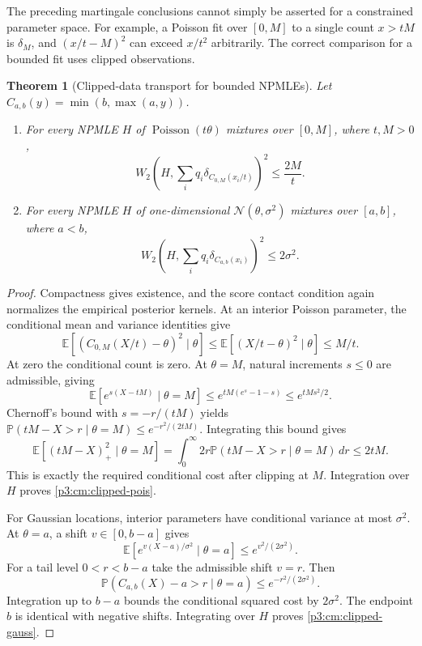 \documentclass[11pt,a4paper]{article}
\newtheorem{theorem}{Theorem}[section]
\theoremstyle{definition}
\theoremstyle{remark}
\numberwithin{equation}{section}
\begin{document}
The preceding martingale conclusions cannot simply be asserted for a
constrained parameter space.  For example, a Poisson fit over $[0,M]$
to a single count $x>tM$ is $\delta_M$, and
$(x/t-M)^2$ can exceed $x/t^2$ arbitrarily.  The correct comparison for
a bounded fit uses clipped observations.

\begin{theorem}[Clipped-data transport for bounded NPMLEs]
\label{p3:cm:clipped}
Let $C_{a,b}(y)=\min(b,\max(a,y))$.
\begin{enumerate}[label=(\roman*),leftmargin=*]
\item For every NPMLE $H$ of $\operatorname{Poisson}(t\theta)$ mixtures
over $[0,M]$, where $t,M>0$,
\begin{equation}\label{p3:cm:clipped-pois}
 W_2\left(H,\sum_iq_i\delta_{C_{0,M}(x_i/t)}\right)^2
 \le\frac{2M}{t}.
\end{equation}
\item For every NPMLE $H$ of one-dimensional
$\mathcal N(\theta,\sigma^2)$ mixtures over $[a,b]$, where $a<b$,
\begin{equation}\label{p3:cm:clipped-gauss}
 W_2\left(H,\sum_iq_i\delta_{C_{a,b}(x_i)}\right)^2
 \le2\sigma^2.
\end{equation}
\end{enumerate}
\end{theorem}

\begin{proof}
Compactness gives existence, and the score contact condition again
normalizes the empirical posterior kernels.  At an interior Poisson
parameter, the conditional mean and variance identities give
\[
 \mathbb E[(C_{0,M}(X/t)-\theta)^2\mid\theta]
 \le\mathbb E[(X/t-\theta)^2\mid\theta]\le M/t.
\]
At zero the conditional count is zero.  At $\theta=M$, natural
increments $s\le0$ are admissible, giving
\[
 \mathbb E[e^{s(X-tM)}\mid\theta=M]
 \le e^{tM(e^s-1-s)}\le e^{tMs^2/2}.
\]
Chernoff's bound with $s=-r/(tM)$ yields
$\mathbb P(tM-X>r\mid\theta=M)\le e^{-r^2/(2tM)}$.
Integrating this bound gives
\[
 \mathbb E[(tM-X)_+^2\mid\theta=M]
 =\int_0^\infty2r\mathbb P(tM-X>r\mid\theta=M)\,dr
 \le2tM.
\]
This is exactly the required conditional cost after clipping at $M$.
Integration over $H$ proves \eqref{p3:cm:clipped-pois}.

For Gaussian locations, interior parameters have conditional variance
at most $\sigma^2$.  At $\theta=a$, a shift $v\in[0,b-a]$ gives
\[
 \mathbb E[e^{v(X-a)/\sigma^2}\mid\theta=a]
 \le e^{v^2/(2\sigma^2)}.
\]
For a tail level $0<r<b-a$ take the admissible shift $v=r$.
Then
\[
 \mathbb P(C_{a,b}(X)-a>r\mid\theta=a)
 \le e^{-r^2/(2\sigma^2)}.
\]
Integration up to $b-a$ bounds the conditional squared cost by
$2\sigma^2$.  The endpoint $b$ is identical with negative shifts.
Integrating over $H$ proves \eqref{p3:cm:clipped-gauss}.
\end{proof}
\end{document}
